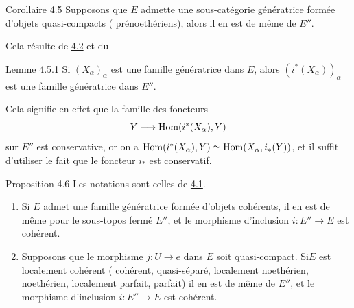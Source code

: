 \documentclass[10pt]{../fichiers-configuration-latex/smfart}
\begin{document}
\begin{enonce*}{Corollaire 4.5}
Supposons que $E$ admette une sous-catégorie génératrice formée
d'objets quasi-compacts (\emph{\resp} prénoethériens), alors il en est de
même de $E''$.
\end{enonce*}

Cela résulte de \hyperref[VI.prop4.2]{4.2} et du

\begin{enonce*}{Lemme 4.5.1}
Si $(X_{\alpha})_{\alpha}$ est une famille génératrice dans $E$, alors
$(i^{\ast}(X_{\alpha}))_{\alpha}$ est une famille génératrice dans $E''$.
\end{enonce*}

Cela signifie en effet que la famille des foncteurs
$$
Y \to \Hom (i^{\ast}(X_{\alpha}), Y)
$$
sur $E''$ est conservative, or on a $\operatorname{Hom}(i^{\ast}(X_{\alpha}), Y)
\simeq \operatorname{Hom}(X_{\alpha}, i_{\ast} (Y))$, et il suffit d'utiliser le
fait que le foncteur $i_{\ast}$ est conservatif.

\begin{enonce*}{Proposition 4.6}
Les notations sont celles de \hyperref[VI.subsec4.1]{4.1}.
\begin{enumerate}
\renewcommand{\theenumi}{\alph{enumi}}
\renewcommand{\labelenumi}{\theenumi)}
\item Si $E$ admet une famille génératrice formée d'objets cohérents,
  il en est de même pour le sous-topos fermé $E''$, et le morphisme
  d'inclusion $i : E''\to E$ est cohérent.

\item Supposons que le morphisme $j : U \to e$ dans $E$ soit quasi-compact.
Si\pageoriginale $E$ est localement cohérent (\emph{\resp} cohérent, \emph{\resp}
quasi-séparé, \emph{\resp} localement noethérien, \emph{\resp} noethérien,
\emph{\resp} localement parfait, \emph{\resp} parfait) il en est de même de $E''$, et le morphisme
d'inclusion $i : E''\to E$ est cohérent.
\end{enumerate}
\end{enonce*}
\end{document}
